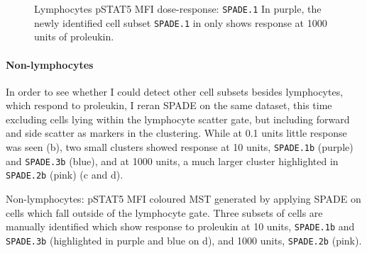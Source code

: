 \begin{figure}
\begin{minipage}{.5\textwidth}
\end{minipage}
\begin{minipage}{.3\textwidth}
{ Lymphocytes pSTAT5 MFI dose-response: \texttt{SPADE.1} }
{
In purple, the newly identified cell subset \texttt{SPADE.1} in  only shows response at 1000 units of proleukin. 
}
\end{minipage}
\end{figure}

\clearpage

\paragraph{Non-lymphocytes}

In order to see whether I could detect other cell subsets besides lymphocytes, which respond to proleukin, I reran \gls{SPADE} on the same dataset, this time excluding cells lying within the lymphocyte scatter gate, but including forward and side scatter as markers in the clustering.
While at 0.1 units little response was seen (b), two small clusters showed response at 10 units, \texttt{SPADE.1b} (purple) and \texttt{SPADE.3b} (blue), and at 1000 units, a much larger cluster highlighted in \texttt{SPADE.2b} (pink) (c and d).

{Non-lymphocytes: pSTAT5 MFI coloured \gls{MST} generated by applying \gls{SPADE} on cells which fall outside of the lymphocyte gate.}
{
  Three subsets of cells are manually identified which show response to proleukin at 10 units, \texttt{SPADE.1b} and \texttt{SPADE.3b} (highlighted in purple and blue on d), and 1000 units, \texttt{SPADE.2b} (pink).
}
% 

